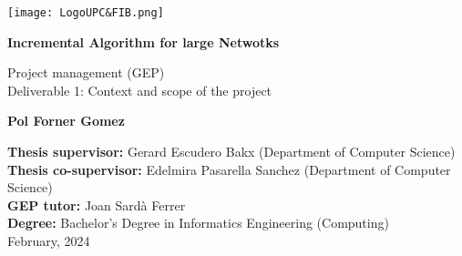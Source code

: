 \begin{titlepage}
    \centering

    \vspace*{1cm}
    \texttt{[image: LogoUPC\&FIB.png]}

    \vspace*{2cm}
    {\huge \textbf{Incremental Algorithm for large Netwotks}}

    \vspace*{.5cm}
    {\LARGE Project management (GEP)} \\
    {\LARGE Deliverable 1: Context and scope of the project}


    \vspace{2cm}

    \LARGE

    \begin{minipage}{.5\textwidth}
        \centering
        \textbf{Pol Forner Gomez}
    \end{minipage}

    \large

    \vfill

    \textbf{Thesis supervisor:}  Gerard Escudero Bakx (Department of Computer Science) \\
    \textbf{Thesis co-supervisor:}  Edelmira Pasarella Sanchez (Department of Computer Science) \\
    \textbf{GEP tutor:}  Joan Sardà Ferrer \\
    \textbf{Degree:}  Bachelor's Degree in Informatics Engineering (Computing) \\

    February, 2024
\end{titlepage}